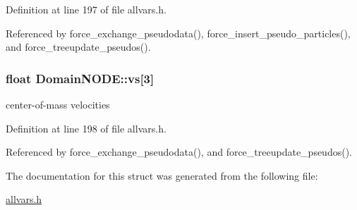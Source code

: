 Definition at line 197 of file allvars.h.



Referenced by force\_\-exchange\_\-pseudodata(), force\_\-insert\_\-pseudo\_\-particles(), and force\_\-treeupdate\_\-pseudos().

\hypertarget{structDomainNODE_a52c312bfff90fd7236c7d1e176c03d9c}{
\subsubsection[{vs}]{\setlength{\rightskip}{0pt plus 5cm}float {\bf DomainNODE::vs}\mbox{[}3\mbox{]}}}
\label{structDomainNODE_a52c312bfff90fd7236c7d1e176c03d9c}
center-\/of-\/mass velocities 

Definition at line 198 of file allvars.h.



Referenced by force\_\-exchange\_\-pseudodata(), and force\_\-treeupdate\_\-pseudos().



The documentation for this struct was generated from the following file:\begin{DoxyCompactItemize}
\item 
\hyperlink{allvars_8h}{allvars.h}\end{DoxyCompactItemize}
